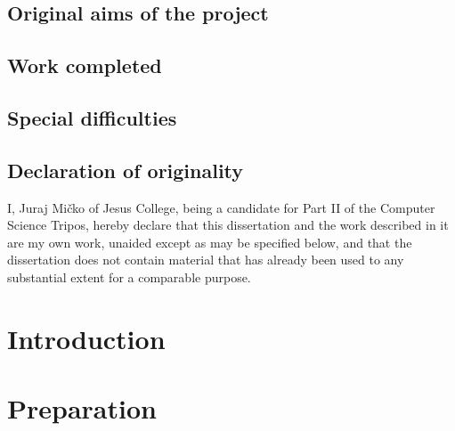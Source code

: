 \documentclass[12pt,a4paper,twoside,openany]{report}
\begin{document}
    \section*{Original aims of the project}



    \section*{Work completed}


    \newpage

    \section*{Special difficulties}



    \section*{Declaration of originality}

    I, Juraj Mi\v{c}ko of Jesus College, being a candidate for Part II of the Computer Science Tripos, hereby declare that this dissertation and the work described in it are my own work, unaided except as may be specified below, and that the dissertation does not contain material that has already been used to any substantial extent for a comparable purpose.

    \bigskip

    \medskip

    \tableofcontents

    \listoffigures

    \listoftables

    \lstlistoflistings


    \pagestyle{headings}


    \chapter{Introduction}\label{ch:introduction}
    


    \chapter{Preparation}\label{ch:preparation}
    
\end{document}
